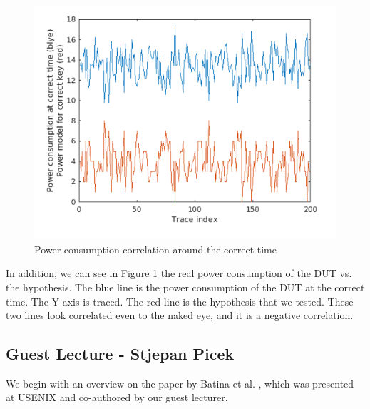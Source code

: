 \begin{figure}[!ht]
    \centering
    \includegraphics[width=1.0\textwidth]{images/chapter8/power_consumption_around_correct_time.png}
    \caption{Power consumption correlation around the correct time} \label{c8_Matlab_power_consumption_correlation_around_the_correct_time:fig}
\end{figure}

In addition, we can see in Figure
\ref{c8_Matlab_power_consumption_correlation_around_the_correct_time:fig} the
real power consumption of the DUT vs. the hypothesis. The blue line is the power
consumption of the DUT at the correct time. The Y-axis is traced. The red line
is the hypothesis that we tested. These two lines look correlated even to the naked
eye, and it is a negative correlation.

\subsection{Guest Lecture - Stjepan Picek}
We begin with an overview on the paper by Batina et al. \cite{batina2019csi}, which was presented at USENIX and co-authored by our guest lecturer.

